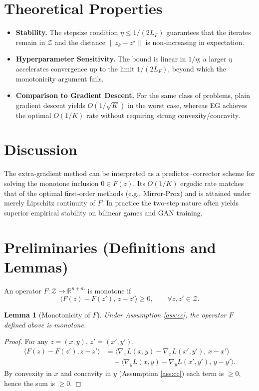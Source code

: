 \documentclass{article}
\newtheorem{lemma}{Lemma}
\newcommand{\R}{\mathbb{R}}
\begin{document}
\section*{Theoretical Properties}
\begin{itemize}
\item \textbf{Stability.} The stepsize condition $\eta\le 1/(2L_{F})$ guarantees that the iterates remain in $\mathcal{Z}$ and the distance $\|z_{k}-z^{\star}\|$ is non‑increasing in expectation.
\item \textbf{Hyperparameter Sensitivity.} The bound is linear in $1/\eta$; a larger $\eta$ accelerates convergence up to the limit $1/(2L_{F})$, beyond which the monotonicity argument fails.
\item \textbf{Comparison to Gradient Descent.} For the same class of problems, plain gradient descent yields $O(1/\sqrt{K})$ in the worst case, whereas EG achieves the optimal $O(1/K)$ rate without requiring strong convexity/concavity.
\end{itemize}

\section*{Discussion}
The extra‑gradient method can be interpreted as a predictor–corrector scheme for solving the monotone inclusion $0\in F(z)$. Its $O(1/K)$ ergodic rate matches that of the optimal first‑order methods (e.g., Mirror‑Prox) and is attained under merely Lipschitz continuity of $F$. In practice the two‑step nature often yields superior empirical stability on bilinear games and GAN training.

\newpage
\section*{Preliminaries (Definitions and Lemmas)}
\begin{definition}
An operator $F:\mathcal{Z}\to\R^{n+m}$ is monotone if
\[
\langle F(z)-F(z'),\,z-z'\rangle\ge0,\qquad\forall z,z'\in\mathcal{Z}.
\]
\end{definition}
\begin{lemma}[Monotonicity of $F$]\label{lem:mono}
Under Assumption \ref{ass:cc}, the operator $F$ defined above is monotone.
\end{lemma}
\begin{proof}
For any $z=(x,y),\,z'=(x',y')$,
\[
\begin{aligned}
\langle F(z)-F(z'),z-z'\rangle
&=\langle\nabla_{x}L(x,y)-\nabla_{x}L(x',y'),\,x-x'\rangle\\
&\quad-\langle\nabla_{y}L(x,y)-\nabla_{y}L(x',y'),\,y-y'\rangle.
\end{aligned}
\]
By convexity in $x$ and concavity in $y$ (Assumption \ref{ass:cc}) each term is $\ge0$, hence the sum is $\ge0$.
\end{proof}
\end{document}
